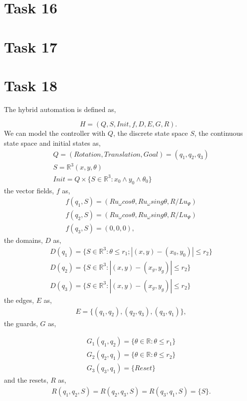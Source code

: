 \documentclass[a4paper,12pt,oneside,onecolumn]{article} %
\begin{document}
\section*{Task 16}

  
  
\section*{Task 17}

    

\section*{Task 18}

The hybrid automation is defined as,

\begin{equation}
    H = (Q,S,Init,f,D,E,G,R).
\end{equation}
We can model the controller with $Q$, the discrete state space $S$,
the continuous state space and initial states as,
\begin{align*}
    &Q=(Rotation,Translation,Goal)=(q_1,q_2,q_3) \\
    &S=\mathbb{R}^3 (x,y,\theta)\\
    &Init = Q \times \{ S \in \mathbb{R}^3 :x_0\wedge y_0 \wedge
    \theta_0\}
\end{align*} 
the vector fields, $f$ as,
\begin{align*}
    &f(q_1,S)=(Ru_{\omega}cos\theta,Ru_{\omega}sing\theta,R/Lu_{\Psi}) \\
    &f(q_2,S)=(Ru_{\omega}cos\theta,Ru_{\omega}sing\theta,R/Lu_{\Psi})\\
    &f(q_3,S)=(0,0,0),
\end{align*}
the domains, $D$ as,
\begin{align*}
    &D(q_1)=\{S\in \mathbb{R}^3:\theta \le r_1; |(x,y)-(x_0,y_0)|\le r_2\} \\
    &D(q_2)=\{S\in \mathbb{R}^3:|(x,y)-(x_g,y_g)| \le r_2\} \\
    &D(q_3)=\{S\in \mathbb{R}^3:|(x,y)-(x_g,y_g)| \le r_2\}
\end{align*}
the edges, $E$ as,
\begin{align*}
    &E = \{(q_1,q_2), (q_2,q_3), (q_3, q_1)\},
\end{align*}
the guards, $G$ as,

\begin{align*}
    &G_1(q_1,q_2)=\{\theta\in\mathbb{R}:\theta\le r_1\} \\
    &G_2(q_2,q_1)=\{\theta\in\mathbb{R}:\theta\le r_2\} \\
    &G_3(q_3,q_1)=\{Reset\}
\end{align*}
and the resets, $R$ as,
\begin{align*}
  &R(q_1,q_2,S)=R(q_2,q_3,S)=R(q_3,q_1,S)=\{S\}.
\end{align*}
\end{document}
